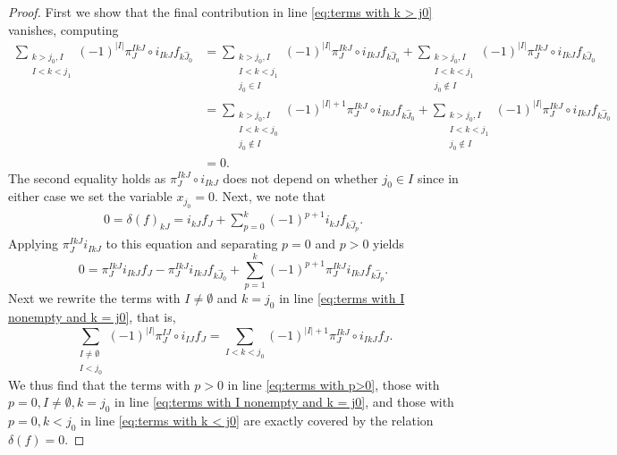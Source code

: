 \documentclass[10pt,a4paper]{amsart}
\begin{document}
\begin{proof}
	First we show that the final contribution in line \eqref{eq:terms with k > j0} vanishes, computing
	\begin{align*}
		\sum_{\substack{k > j_0, I\\I < k < j_1}} (-1)^{|I|} \pi_{J}^{IkJ} \circ i_{IkJ} f_{k\hat{J}_0} &= \sum_{\substack{k > j_0, I\\I < k < j_1 \\ 
				j_0 \in I}} (-1)^{|I|} \pi_{J}^{IkJ} \circ i_{IkJ} f_{k\hat{J}_0} + \sum_{\substack{k > j_0, I\\I < k < j_1 \\ j_0 \notin I}} (-1)^{|I|} \pi_{J}^{IkJ} \circ i_{IkJ}f_{k\hat{J}_0}\\
		&= \sum_{\substack{k > j_0, I\\I < k < j_0\\ j_0 \notin I}} (-1)^{|I| + 1} \pi_{J}^{IkJ} \circ i_{IkJ} f_{k\hat{J}_0} + \sum_{\substack{k > j_0, I\\I < k< j_1\\ j_0 \notin I}} (-1)^{|I|} \pi_{J}^{IkJ} \circ i_{IkJ}f_{k\hat{J}_0}\\& = 0.
	\end{align*}
	The second equality holds as $\pi_{J}^{IkJ} \circ i_{IkJ}$ does not depend on whether $j_0 \in I$ since in either case we set the variable $x_{j_0} = 0$. Next, we note that 
	\begin{align*}
		0 = \delta(f)_{kJ} = i_{kJ} f_J + \sum_{p = 0}^k (-1)^{p+1} i_{kJ} f_{k\hat{J}_p}.
	\end{align*}
	Applying $\pi_{J}^{IkJ} i_{IkJ}$ to this equation and separating $p = 0$ and $p > 0$ yields
	\begin{equation*}
		0 = \pi_{J}^{IkJ} i_{IkJ} f_J - \pi_{J}^{IkJ} i_{IkJ} f_{k\hat{J}_0} + \sum_{p=1}^{k} (-1)^{p+1} \pi_{J}^{IkJ} i_{IkJ} f_{k\hat{J}_p}.
	\end{equation*}
	Next we rewrite the terms with $I \neq \emptyset$ and $k = j_0$ in line \eqref{eq:terms with I nonempty and k = j0}, that is,
	\begin{equation*}
		\sum_{\substack{I\neq \emptyset\\I < j_0}} (-1)^{|I|} \pi_{J}^{IJ} \circ i_{IJ} f_{J} = \sum_{I < k < j_0} (-1)^{|I|+1} \pi_{J}^{IkJ} \circ i_{IkJ} f_{J}.
	\end{equation*}
	We thus find that the terms with $p > 0$ in line \eqref{eq:terms with p>0}, those with $p = 0, I \neq \emptyset, k = j_0$ in line \eqref{eq:terms with I nonempty and k = j0}, and those with $p =0, k < j_0$ in line \eqref{eq:terms with k < j0} are exactly covered by the relation $\delta(f) = 0$.
\end{proof}
\end{document}
